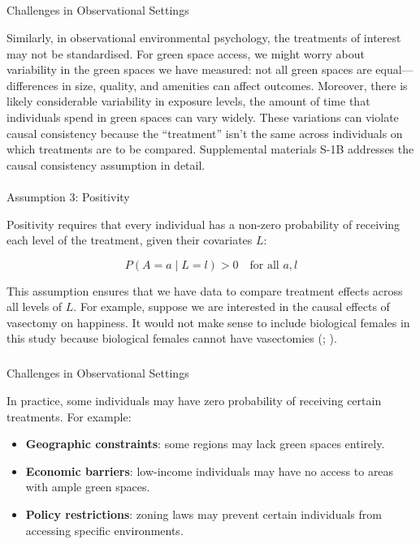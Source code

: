 \documentclass[
  singlecolumn]{article}
\makeatletter
\let\oldparagraph\paragraph
\renewcommand{\paragraph}{
    \@ifstar
      \xxxParagraphStar
      \xxxParagraphNoStar
  }
\newcommand{\xxxParagraphStar}[1]{\oldparagraph*{#1}\mbox{}}
\newcommand{\xxxParagraphNoStar}[1]{\oldparagraph{#1}\mbox{}}
\let\oldsubparagraph\subparagraph
\renewcommand{\subparagraph}{
    \@ifstar
      \xxxSubParagraphStar
      \xxxSubParagraphNoStar
  }
\newcommand{\xxxSubParagraphStar}[1]{\oldsubparagraph*{#1}\mbox{}}
\newcommand{\xxxSubParagraphNoStar}[1]{\oldsubparagraph{#1}\mbox{}}
\providecommand{\tightlist}{%
  \setlength{\itemsep}{0pt}\setlength{\parskip}{0pt}}\usepackage{longtable,booktabs,array}
\makeatother
\begin{document}
\subparagraph{Challenges in Observational
Settings}\label{challenges-in-observational-settings-1}

Similarly, in observational environmental psychology, the treatments of
interest may not be standardised. For green space access, we might worry
about variability in the green spaces we have measured: not all green
spaces are equal---differences in size, quality, and amenities can
affect outcomes. Moreover, there is likely considerable variability in
exposure levels, the amount of time that individuals spend in green
spaces can vary widely. These variations can violate causal consistency
because the ``treatment'' isn't the same across individuals on which
treatments are to be compared. Supplemental materials S-1B addresses the
causal consistency assumption in detail.

\paragraph{Assumption 3: Positivity}\label{assumption-3-positivity}

Positivity requires that every individual has a non-zero probability of
receiving each level of the treatment, given their covariates \(L\):

\[
P(A = a \mid L = l) > 0 \quad \text{for all } a, l
\]

This assumption ensures that we have data to compare treatment effects
across all levels of \(L\). For example, suppose we are interested in
the causal effects of vasectomy on happiness. It would not make sense to
include biological females in this study because biological females
cannot have vasectomies (; ).

\subparagraph{Challenges in Observational
Settings}\label{challenges-in-observational-settings-2}

In practice, some individuals may have zero probability of receiving
certain treatments. For example:

\begin{itemize}
\tightlist
\item
  \textbf{Geographic constraints}: some regions may lack green spaces
  entirely.
\item
  \textbf{Economic barriers}: low-income individuals may have no access
  to areas with ample green spaces.
\item
  \textbf{Policy restrictions}: zoning laws may prevent certain
  individuals from accessing specific environments.
\end{itemize}
\end{document}

